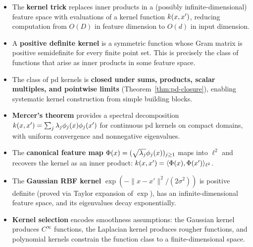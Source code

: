 \documentclass[11pt,a4paper]{article}
\begin{document}
\begin{itemize}
    \item The \textbf{kernel trick} replaces inner products in a
    (possibly infinite-dimensional) feature space with evaluations
    of a kernel function $k(x, x')$, reducing computation from
    $O(D)$ in feature dimension to $O(d)$ in input dimension.

    \item A \textbf{positive definite kernel} is a symmetric function
    whose Gram matrix is positive semidefinite for every finite point
    set. This is precisely the class of functions that arise as inner
    products in some feature space.

    \item The class of pd kernels is \textbf{closed under sums,
    products, scalar multiples, and pointwise limits}
    (Theorem~\ref{thm:pd-closure}), enabling systematic kernel
    construction from simple building blocks.

    \item \textbf{Mercer's theorem} provides a spectral decomposition
    $k(x, x') = \sum_j \lambda_j \phi_j(x) \phi_j(x')$
    for continuous pd kernels on compact domains, with uniform
    convergence and nonneg\-ative eigenvalues.

    \item The \textbf{canonical feature map} $\Phi(x) =
    (\sqrt{\lambda_j} \phi_j(x))_{j \ge 1}$ maps into $\ell^2$
    and recovers the kernel as an inner product: $k(x, x') =
    \langle \Phi(x), \Phi(x') \rangle_{\ell^2}$.

    \item The \textbf{Gaussian RBF kernel} $\exp(-\|x - x'\|^2 /
    (2\sigma^2))$ is positive definite (proved via Taylor expansion
    of $\exp$), has an infinite-dimensional feature space, and its
    eigenvalues decay exponentially.

    \item \textbf{Kernel selection} encodes smoothness assumptions:
    the Gaussian kernel produces $C^\infty$ functions, the Laplacian
    kernel produces rougher functions, and polynomial kernels
    constrain the function class to a finite-dimensional space.
\end{itemize}

\end{document}
